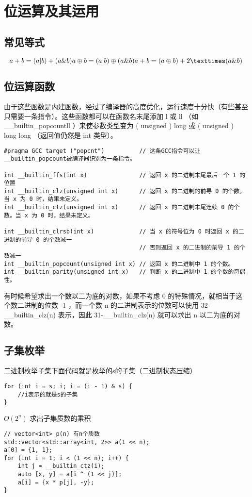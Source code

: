 \section{位运算及其运用}
\subsection{常见等式}
$$
a+b=(a|b)+(a\&b)\\
a\oplus b=(a|b)\oplus(a\&b) \\
a+b=(a\oplus b)+2×(a\&b) \\
$$
\subsection{位运算函数}

\par 由于这些函数是内建函数，经过了编译器的高度优化，运行速度十分快（有些甚至只需要一条指令）。这些函数都可以在函数名末尾添加 l 或 ll （如 \_\_builtin\_popcountll ）来使参数类型变为 ( unsigned ) long 或 ( unsigned ) long long （返回值仍然是 int 类型）。
\begin{verbatim}
#pragma GCC target ("popcnt")          // 这条GCC指令可以让__builtin_popcount被编译器识别为一条指令。

int __builtin_ffs(int x)               // 返回 x 的二进制末尾最后一个 1 的位置
int __builtin_clz(unsigned int x)      // 返回 x 的二进制的前导 0 的个数。当 x 为 0 时，结果未定义。
int __builtin_ctz(unsigned int x)      // 返回 x 的二进制末尾连续 0 的个数。当 x 为 0 时，结果未定义。

int __builtin_clrsb(int x)             // 当 x 的符号位为 0 时返回 x 的二进制的前导 0 的个数减一
                                       // 否则返回 x 的二进制的前导 1 的个数减一
int __builtin_popcount(unsigned int x) // 返回 x 的二进制中 1 的个数。
int __builtin_parity(unsigned int x)   // 判断 x 的二进制中 1 的个数的奇偶性。
\end{verbatim}

\par 有时候希望求出一个数以二为底的对数，如果不考虑 0 的特殊情况，就相当于这个数二进制的位数 -1 ，而一个数 n 的二进制表示的位数可以使用 32-\_\_builtin\_clz(n) 表示，因此 31-\_\_builtin\_clz(n) 就可以求出 n 以二为底的对数。

\subsection{子集枚举}
\par \noindent 二进制枚举子集下面代码就是枚举的s的子集（二进制状态压缩）
\begin{verbatim}
for (int i = s; i; i = (i - 1) & s) {
    //i表示的就是s的子集
}
\end{verbatim}
\par \noindent $O(2^n)$ 求出子集质数的乘积
\begin{verbatim}
// vector<int> p(n) 有n个质数
std::vector<std::array<int, 2>> a(1 << n);
a[0] = {1, 1};
for (int i = 1; i < (1 << n); i++) {
    int j = __builtin_ctz(i);
    auto [x, y] = a[i ^ (1 << j)];
    a[i] = {x * p[j], -y};
}
\end{verbatim}